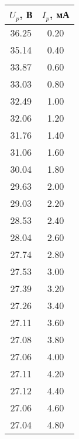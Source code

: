 \begin{tabular}{cc}
\toprule
$U_p$, В & $I_p$, мА \\
\midrule
36.25 & 0.20 \\
35.14 & 0.40 \\
33.87 & 0.60 \\
33.03 & 0.80 \\
32.49 & 1.00 \\
32.06 & 1.20 \\
31.76 & 1.40 \\
31.06 & 1.60 \\
30.04 & 1.80 \\
29.63 & 2.00 \\
29.03 & 2.20 \\
28.53 & 2.40 \\
28.04 & 2.60 \\
27.74 & 2.80 \\
27.53 & 3.00 \\
27.39 & 3.20 \\
27.26 & 3.40 \\
27.11 & 3.60 \\
27.08 & 3.80 \\
27.06 & 4.00 \\
27.11 & 4.20 \\
27.12 & 4.40 \\
27.06 & 4.60 \\
27.04 & 4.80 \\
\bottomrule
\end{tabular}

